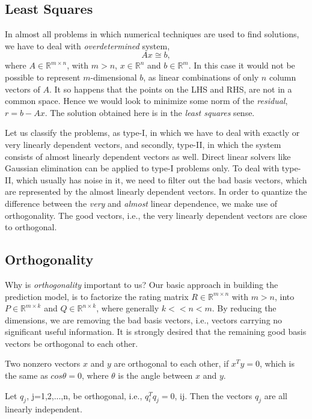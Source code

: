 \subsection{Least Squares}
In almost all problems in which numerical techniques are used to find
solutions, we have to deal with \emph{overdetermined} system, 
\[
 Ax\cong b,
\]
where $A\in \mathbb{R}^{m \times n}$, with $m>n$, $x\in \mathbb{R}^n$ and $b\in
\mathbb{R}^m$. In this case it would not be possible to represent
$m$-dimensional $b$, as linear combinations of only $n$ column vectors of $A$.
It so happens that the points on the LHS and RHS, are not in a common space.
Hence we would look to minimize some norm of the \emph{residual}, $r=b-Ax$. The
solution obtained here is in the \emph{least squares} sense. 


Let us classify the problems, as type-I, in which we have to deal with exactly
or very linearly dependent vectors, and secondly, type-II, in which the system
consists of almost linearly dependent vectors as well. Direct linear solvers
like Gaussian elimination can be applied to type-I problems only. To deal with
type-II, which usually has noise in it, we need to filter out the bad basis
vectors, which are represented by the almost linearly dependent vectors. In
order to quantize the difference between the \emph{very} and \emph{almost}
linear dependence, we make use of orthogonality. The good vectors, i.e., the
very linearly dependent vectors are close to orthogonal. 

\subsection{Orthogonality}
Why is \emph{orthogonality} important to us? Our basic approach in building the
prediction model, is to factorize the rating matrix $R\in \mathbb{R}^{m \times
n}$ with $m>n$, into $P\in \mathbb{R}^{m \times k}$ and $Q\in \mathbb{R}^{n
\times k}$, where generally $k<<n<m$. By reducing the dimensions, we are
removing the bad basis vectors, i.e., vectors carrying no significant useful
information. It is strongly desired that the remaining good basis vectors be
orthogonal to each other. 

Two nonzero vectors $x$ and $y$ are orthogonal to each other, if $x^Ty=0$, which
is the same as $cos\theta=0$, where $\theta$ is the angle between $x$ and $y$. 
\begin{proposition}
Let $q_j$, j=1,2,...,n, be orthogonal, i.e., $q_i^Tq_j=0$, i\unequal j. Then the
vectors $q_j$ are all linearly independent.
\end{proposition}

